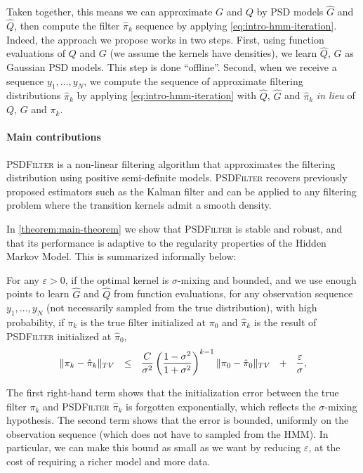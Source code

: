 Taken together, this means we can approximate $G$ and $Q$ by PSD models $\hat G$ and $\hat Q$, then compute the filter $\hat \pi_k$ sequence by applying \cref{eq:intro-hmm-iteration}. Indeed, the approach we propose works in two steps. First, using function evaluations of $Q$ and $G$ (we assume the kernels have densities), we learn $\hat Q$, $\hat G$ as Gaussian PSD models. This step is done ``offline''. Second, when we receive a sequence $y_1, \ldots, y_N$, we compute the sequence of approximate filtering distributions $\hat\pi_k$ by applying \cref{eq:intro-hmm-iteration} with $\hat Q$, $\hat G$ and $\hat \pi_k$ \emph{in lieu} of $Q$, $G$ and $\pi_k$.

\paragraph{Main contributions}
\textsc{PSDFilter} is a non-linear filtering algorithm that approximates the filtering distribution using positive semi-definite models. \textsc{PSDFilter} recovers previously proposed estimators such as the Kalman filter and can be applied to any filtering problem where the transition kernels admit a smooth density.

In \cref{theorem:main-theorem} we show that \textsc{PSDFilter} is stable and robust, and that its performance is adaptive to the regularity properties of the Hidden Markov Model. This is summarized informally below:
\begin{mdframed}
\begin{informaltheorem}
For any $\varepsilon > 0$, if the optimal kernel is $\sigma$-mixing and bounded, and we use enough points to learn $\hat G$ and $\hat Q$ from function evaluations, for any observation sequence $y_1, \ldots, y_N$ (not necessarily sampled from the true distribution), with high probability, if $\pi_k$ is the true filter initialized at $\pi_0$ and $\hat \pi_k$ is the result of \textsc{PSDFilter} initialized at $\hat \pi_0$,
\begin{align*}
    \Vert \pi_k - \hat\pi_k\Vert_{TV} ~~\leq~~ \frac{C}{\sigma^2}\left(\frac{1-\sigma^2}{1 + \sigma^2}\right)^{k-1}\|\pi_0 - \hat{\pi}_0\|_{TV} ~~+~~ \frac{\varepsilon}{\sigma},
\end{align*}
\end{informaltheorem}
\end{mdframed}
The first right-hand term shows that the initialization error between the true filter $\pi_k$ and \textsc{PSDFilter} $\hat \pi_k$ is forgotten exponentially, which reflects the $\sigma$-mixing hypothesis. The second term shows that the error is bounded, uniformly on the observation sequence (which does not have to sampled from the HMM). In particular, we can make this bound as small as we want by reducing $\varepsilon$, at the cost of requiring a richer model and more data.

